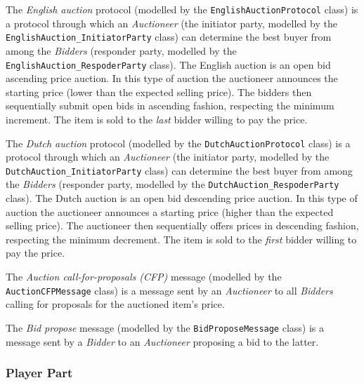 The \textit{English auction} protocol (modelled by the \texttt{EnglishAuctionProtocol} class) is a protocol through which an \textit{Auctioneer} (the initiator party, modelled by the \texttt{EnglishAuction_InitiatorParty} class) can determine the best buyer from among the \textit{Bidders} (responder party, modelled by the \texttt{EnglishAuction_RespoderParty} class).
The English auction is an open bid ascending price auction.
In this type of auction the auctioneer announces the starting price (lower than the expected selling price).
The bidders then sequentially submit open bids in ascending fashion, respecting the minimum increment.
The item is sold to the \textit{last} bidder willing to pay the price.

The \textit{Dutch auction} protocol (modelled by the \texttt{DutchAuctionProtocol} class) is a protocol through which an \textit{Auctioneer} (the initiator party, modelled by the \texttt{DutchAuction_InitiatorParty} class) can determine the best buyer from among the \textit{Bidders} (responder party, modelled by the \texttt{DutchAuction_RespoderParty} class).
The Dutch auction is an open bid descending price auction.
In this type of auction the auctioneer announces a starting price (higher than the expected selling price).
The auctioneer then sequentially offers prices in descending fashion, respecting the minimum decrement.
The item is sold to the \textit{first} bidder willing to pay the price.

The \textit{Auction call-for-proposals (CFP)} message (modelled by the \texttt{AuctionCFPMessage} class) is a message sent by an \textit{Auctioneer} to all \textit{Bidders} calling for proposals for the auctioned item's price.

The \textit{Bid propose} message (modelled by the \texttt{BidProposeMessage} class) is a message sent by a \textit{Bidder} to an \textit{Auctioneer} proposing a bid to the latter.

\subsubsection*{Player Part}


